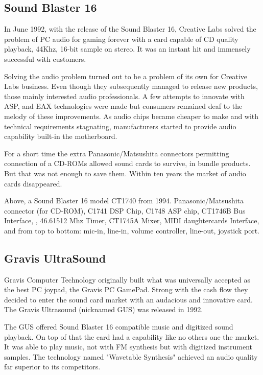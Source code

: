 \subsection{Sound Blaster 16}
 In June 1992, with the release of the Sound Blaster 16, Creative Labs solved the problem of PC audio for gaming forever with a card capable of CD quality playback, 44Khz, 16-bit sample on stereo. It was an instant hit and immensely successful with customers.\\
\par
{}
\par
Solving the audio problem turned out to be a problem of its own for Creative Labs business. Even though they subsequently managed to release new products, those mainly interested audio professionals. A few attempts to innovate with ASP, and EAX technologies were made but consumers remained deaf to the melody of these improvements. As audio chips became cheaper to make and with technical requirements stagnating, manufacturers started to provide audio capability built-in the motherboard.\\
\par
For a short time the extra Panasonic/Matsushita connectors permitting connection of a CD-ROMs allowed sound cards to survive, in bundle products. But that was not enough to save them. Within ten years the market of audio cards disappeared.\\
\par
{}
\par
Above, a Sound Blaster 16 model CT1740 from 1994.  Panasonic/Matsushita connector (for CD-ROM),  C1741 DSP Chip,  C1748 ASP chip,  CT1746B Bus Interface, , 46.61512 Mhz Timer,  CT1745A Mixer,  MIDI daughtercards Interface, and  from top to bottom: mic-in, line-in, volume controller, line-out, joystick port.







\subsection{Gravis UltraSound}
Gravis Computer Technology originally built what was universally accepted as the best PC joypad, the Gravis PC GamePad. Strong with the cash flow they decided to enter the sound card market with an audacious and innovative card. The Gravis Ultrasound (nicknamed GUS) was released in 1992.\\
\par
The GUS offered Sound Blaster 16 compatible music and digitized sound playback. On top of that the card had a capability like no others one the market. It was able to play music, not with FM synthesis but with digitized instrument samples. The technology named "Wavetable Synthesis" achieved an audio quality far superior to its competitors.



